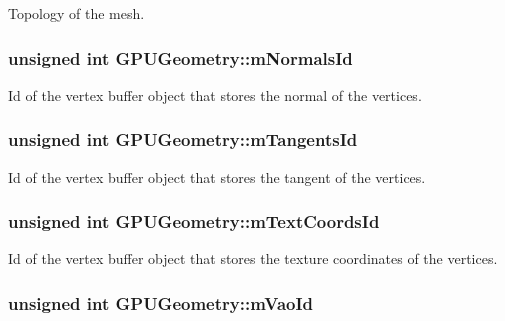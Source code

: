 Topology of the mesh. 

\hypertarget{class_g_p_u_geometry_a90eb49a3475a9ee00e5efc8d3bb9d2f2}{
\subsubsection[{m\+Normals\+Id}]{\setlength{\rightskip}{0pt plus 5cm}unsigned int G\+P\+U\+Geometry\+::m\+Normals\+Id\hspace{0.3cm}{\ttfamily [private]}}}\label{class_g_p_u_geometry_a90eb49a3475a9ee00e5efc8d3bb9d2f2}


Id of the vertex buffer object that stores the normal of the vertices. 

\hypertarget{class_g_p_u_geometry_a73691872b73594e9adee41c5437e70bf}{
\subsubsection[{m\+Tangents\+Id}]{\setlength{\rightskip}{0pt plus 5cm}unsigned int G\+P\+U\+Geometry\+::m\+Tangents\+Id\hspace{0.3cm}{\ttfamily [private]}}}\label{class_g_p_u_geometry_a73691872b73594e9adee41c5437e70bf}


Id of the vertex buffer object that stores the tangent of the vertices. 

\hypertarget{class_g_p_u_geometry_a47934d33be572e934ab7a06fbc822485}{
\subsubsection[{m\+Text\+Coords\+Id}]{\setlength{\rightskip}{0pt plus 5cm}unsigned int G\+P\+U\+Geometry\+::m\+Text\+Coords\+Id\hspace{0.3cm}{\ttfamily [private]}}}\label{class_g_p_u_geometry_a47934d33be572e934ab7a06fbc822485}


Id of the vertex buffer object that stores the texture coordinates of the vertices. 

\hypertarget{class_g_p_u_geometry_a23f035d901894a6a856f907f273787e6}{
\subsubsection[{m\+Vao\+Id}]{\setlength{\rightskip}{0pt plus 5cm}unsigned int G\+P\+U\+Geometry\+::m\+Vao\+Id\hspace{0.3cm}{\ttfamily [private]}}}\label{class_g_p_u_geometry_a23f035d901894a6a856f907f273787e6}


